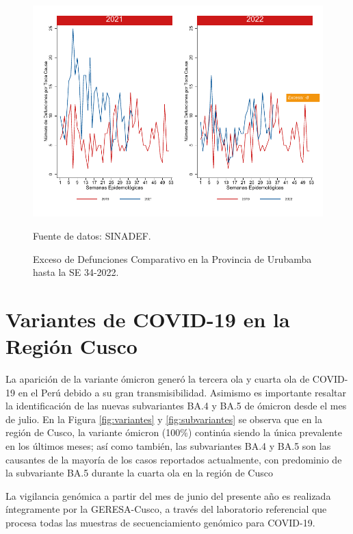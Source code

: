 \documentclass[12pt,a4paper,openany]{book}
\begin{document}
	\begin{figure}[h]
		\caption{Exceso de Defunciones Comparativo en la Provincia de Urubamba hasta la SE 34-2022.}\label{fig:exceso_urub}
		\begin{center}
			\includegraphics[width=0.7\linewidth]{../figuras/exceso_13.pdf}
		\end{center}
		{\footnotesize {Fuente de datos: SINADEF.}}
	\end{figure}
	
	\clearpage
	
	\clearpage
	
	\section* {Variantes de COVID-19 en la Región Cusco}
	\noindent La aparición de la variante ómicron generó la tercera ola y cuarta ola de COVID-19 en el Perú debido a su gran transmisibilidad. Asimismo es importante resaltar la identificación de las nuevas subvariantes BA.4 y BA.5 de ómicron desde el mes de julio. En la Figura \ref{fig:variantes} y \ref{fig:subvariantes} se observa que en la región de Cusco, la variante ómicron (100$\%$) continúa siendo la única prevalente en los últimos meses; así como también, las subvariantes BA.4 y BA.5 son las causantes de la mayoría de los casos reportados actualmente, con predominio de la subvariante BA.5 durante la cuarta ola en la región de Cusco
	 
	La vigilancia genómica a partir del mes de junio del presente año es realizada íntegramente por la GERESA-Cusco, a través del laboratorio referencial que procesa todas las muestras de secuenciamiento genómico para COVID-19.
	
\end{document}

